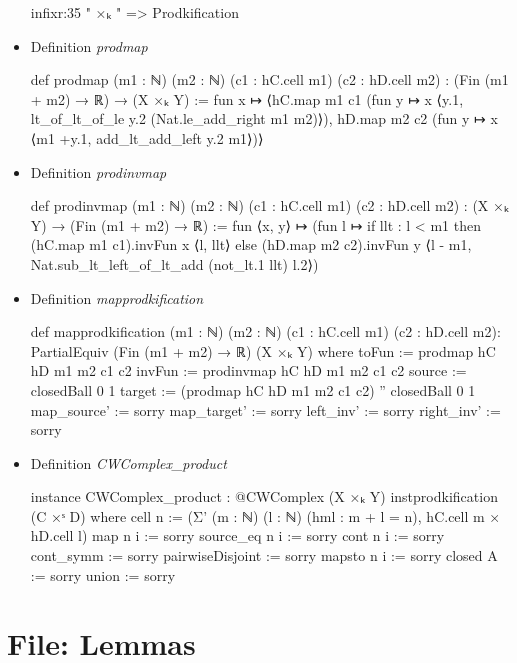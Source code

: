 \documentclass[colorinlistoftodos]{article}
\begin{document}
\begin{itemize}
\begin{leancode}
infixr:35 " ×ₖ "  => Prodkification
\end{leancode}
  \item Definition \emph{prodmap} 
\begin{leancode}
def prodmap (m1 : ℕ) (m2 : ℕ) (c1 : hC.cell m1) (c2 : hD.cell m2) :
(Fin (m1 + m2) → ℝ) → (X ×ₖ Y) :=
fun x ↦ ⟨hC.map m1 c1 (fun y ↦ x ⟨y.1, lt_of_lt_of_le y.2 (Nat.le_add_right m1 m2)⟩),
hD.map m2 c2 (fun y ↦ x ⟨m1 +y.1, add_lt_add_left y.2 m1⟩)⟩
\end{leancode}
  \item Definition \emph{prodinvmap}
\begin{leancode}
def prodinvmap (m1 : ℕ) (m2 : ℕ) (c1 : hC.cell m1) (c2 : hD.cell m2) :
(X ×ₖ Y) → (Fin (m1 + m2) → ℝ) :=
fun ⟨x, y⟩ ↦ (fun l ↦ if llt : l < m1 then (hC.map m1 c1).invFun x ⟨l, llt⟩
else (hD.map m2 c2).invFun y ⟨l - m1, Nat.sub_lt_left_of_lt_add (not_lt.1 llt) l.2⟩)
\end{leancode}
  \item Definition \emph{mapprodkification} 
\begin{leancode}
def mapprodkification (m1 : ℕ) (m2 : ℕ) (c1 : hC.cell m1) (c2 : hD.cell m2):
  PartialEquiv (Fin (m1 + m2) → ℝ) (X ×ₖ Y) where
    toFun :=  prodmap hC hD m1 m2 c1 c2
    invFun := prodinvmap hC hD m1 m2 c1 c2
    source := closedBall 0 1
    target := (prodmap hC hD m1 m2 c1 c2) '' closedBall 0 1
    map_source' := sorry
    map_target' := sorry
    left_inv' := sorry
    right_inv' := sorry
\end{leancode}
  \item Definition \emph{CWComplex\_product} 
\begin{leancode}
instance CWComplex_product : @CWComplex (X ×ₖ Y) instprodkification (C ×ˢ D) where
  cell n := (Σ' (m : ℕ) (l : ℕ) (hml : m + l = n), hC.cell m × hD.cell l)
  map n i := sorry
  source_eq n i := sorry
  cont n i := sorry
  cont_symm := sorry
  pairwiseDisjoint := sorry
  mapsto n i := sorry
  closed A := sorry
  union := sorry
\end{leancode}
\end{itemize}

\section{File: Lemmas}
\end{document}
